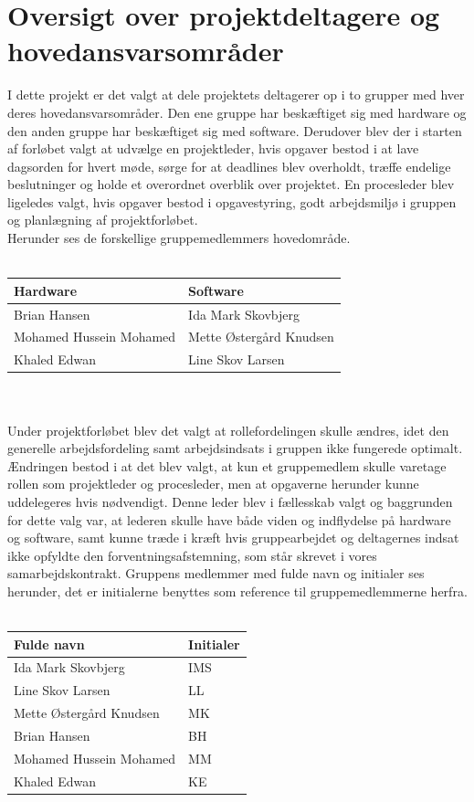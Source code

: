 \section{Oversigt over projektdeltagere og hovedansvarsområder}
I dette projekt er det valgt at dele projektets deltagerer op i to grupper med hver deres hovedansvarsområder. Den ene gruppe har beskæftiget sig med hardware og den anden gruppe har beskæftiget sig med software. Derudover blev der i starten af forløbet valgt at udvælge en projektleder, hvis opgaver bestod i at lave dagsorden for hvert møde, sørge for at deadlines blev overholdt, træffe endelige beslutninger og holde et overordnet overblik over projektet.  En procesleder blev ligeledes valgt, hvis opgaver bestod i opgavestyring, godt arbejdsmiljø i gruppen og planlægning af projektforløbet. \\
Herunder ses de forskellige gruppemedlemmers hovedområde.\\\\
\begin{tabular}{| l | l |} \hline
\textbf{Hardware} & \textbf{Software}\\\hline
Brian Hansen & Ida Mark Skovbjerg \\\hline 
Mohamed Hussein Mohamed & Mette Østergård Knudsen \\\hline
Khaled Edwan & Line Skov Larsen  \\\hline 
\end{tabular}
\\\\
Under projektforløbet blev det valgt at rollefordelingen skulle ændres, idet den generelle arbejdsfordeling samt arbejdsindsats i gruppen ikke fungerede optimalt. Ændringen bestod i at det blev valgt, at kun et gruppemedlem skulle varetage rollen som projektleder og procesleder, men at opgaverne herunder kunne uddelegeres hvis nødvendigt. Denne leder blev i fællesskab valgt og baggrunden for dette valg var, at lederen skulle have både viden og indflydelse på hardware og software, samt kunne træde i kræft hvis gruppearbejdet og deltagernes indsat ikke opfyldte den forventningsafstemning, som står skrevet i vores samarbejdskontrakt. Gruppens medlemmer med fulde navn og initialer ses herunder, det er initialerne benyttes som reference til gruppemedlemmerne herfra. \\\\
\begin{tabular}{| l | l |} \hline
\textbf{Fulde navn} & \textbf{Initialer}\\\hline
Ida Mark Skovbjerg & IMS \\\hline 
Line Skov Larsen & LL \\\hline
Mette Østergård Knudsen & MK  \\\hline 
Brian Hansen & BH \\\hline
Mohamed Hussein Mohamed & MM \\\hline 
Khaled Edwan & KE \\\hline
\end{tabular}
